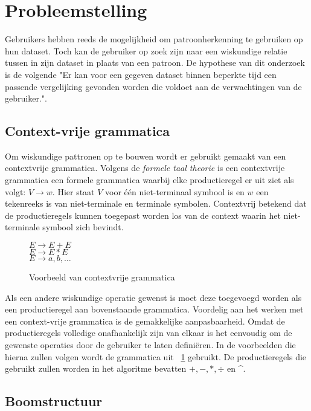 \documentclass[Main.tex]{subfiles}
\begin{document}
\section{Probleemstelling}
Gebruikers hebben reeds de mogelijkheid om patroonherkenning te gebruiken op hun dataset. Toch kan de gebruiker op zoek zijn naar een wiskundige relatie tussen in zijn dataset in plaats van een patroon. De hypothese van dit onderzoek is de volgende "Er kan voor een gegeven dataset binnen beperkte tijd een passende vergelijking gevonden worden die voldoet aan de verwachtingen van de gebruiker.".

\subsection{Context-vrije grammatica}
Om wiskundige pattronen op te bouwen wordt er gebruikt gemaakt van een contextvrije grammatica. Volgens de \textit{formele taal theorie} \cite{cfg}
is een contextvrije grammatica een formele grammatica waarbij elke productieregel er uit ziet als volgt: $V \rightarrow w$. Hier staat $V$  voor \'e\'en niet-terminaal symbool is en $w$ een tekenreeks is van niet-terminale en terminale symbolen. Contextvrij betekend dat de productieregels kunnen toegepast worden los van de context waarin het niet-terminale symbool zich bevindt. \\

\begin{figure}[!htb]
\centering
\begin{framed}
$E \rightarrow E + E$ \\
$E \rightarrow E \ast E$ \\
$E \rightarrow a,b,\dotsc$
\end{framed}
\caption{Voorbeeld van contextvrije grammatica}
\label{fig:cfg}
\end{figure}

Als een andere wiskundige operatie gewenst is moet deze toegevoegd worden als een productieregel aan bovenstaande grammatica. Voordelig aan het werken met een context-vrije grammatica is de gemakkelijke aanpasbaarheid. Omdat de productieregels volledige onafhankelijk zijn van elkaar is het eenvoudig om de gewenste operaties door de gebruiker te laten defini\"eren. In de voorbeelden die hierna zullen volgen wordt de grammatica uit ~\ref{fig:cfg} gebruikt. De productieregels die gebruikt zullen worden in het algoritme bevatten $+, -, \ast, \div$ en \^{}.

\subsection{Boomstructuur}
\end{document}
